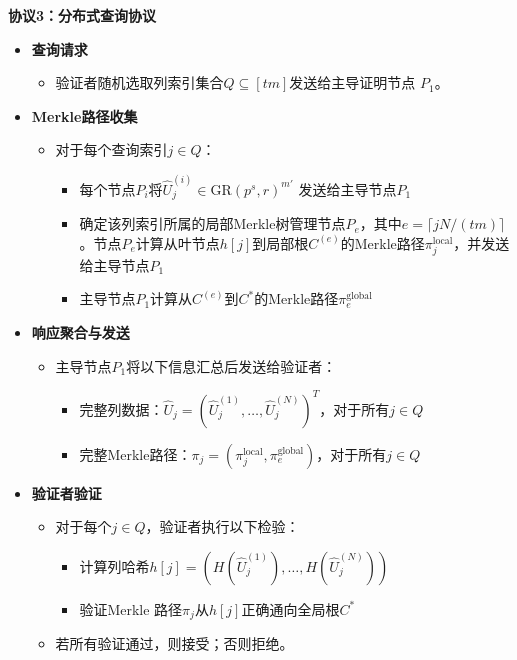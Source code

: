 \documentclass{article}
\begin{document}
\begin{tcolorbox}[
  width=\textwidth,
  colframe=black,
  colback=white,
  sharp corners,
  boxsep=2pt,
  left=2pt,right=2pt,top=3pt,bottom=3pt
]


\textbf{协议3：分布式查询协议}
\begin{itemize}
    
    \item \textbf{查询请求}
    \begin{itemize}
      \item 验证者随机选取列索引集合$Q \subseteq [tm]$发送给主导证明节点 \(P_{1}\)。
    \end{itemize}

    \item \textbf{Merkle路径收集}
    \begin{itemize}
      \item 对于每个查询索引$j \in Q$：
      \begin{itemize}
      \item 每个节点$P_i$将$\hat{U}_j^{(i)} \in \mathrm{GR}(p^s, r)^{m'}$ 发送给主导节点$P_1$
      \item 确定该列索引所属的局部Merkle树管理节点$P_e$，其中$e = \lceil jN/(tm) \rceil$。节点$P_e$计算从叶节点$h[j]$到局部根$C^{(e)}$的Merkle路径$\pi_j^{\text{local}}$，并发送给主导节点$P_1$
      \item 主导节点$P_1$计算从$C^{(e)}$到$C^*$的Merkle路径$\pi_e^{\text{global}}$
      \end{itemize}
    \end{itemize}

    \item \textbf{响应聚合与发送}
    \begin{itemize}
      \item 主导节点$P_1$将以下信息汇总后发送给验证者：
      \begin{itemize}
        \item 完整列数据：$\hat{U}_j = (\hat{U}_j^{(1)}, \ldots, \hat{U}_j^{(N)})^T$，对于所有$j \in Q$
        \item 完整Merkle路径：$\pi_j = (\pi_j^{\text{local}}, \pi_e^{\text{global}})$，对于所有$j \in Q$
      \end{itemize}
    \end{itemize}

    \item \textbf{验证者验证}
    \begin{itemize}
      \item 对于每个$j \in Q$，验证者执行以下检验：
      \begin{itemize}
        \item 计算列哈希$h[j] = (H(\hat{U}_j^{(1)}), \ldots, H(\hat{U}_j^{(N)}))$
        \item 验证Merkle 路径$\pi_j$从$h[j]$正确通向全局根$C^*$
      \end{itemize}
      \item 若所有验证通过，则接受；否则拒绝。
    \end{itemize}

  
  \end{itemize}

\end{tcolorbox}
\end{document}

